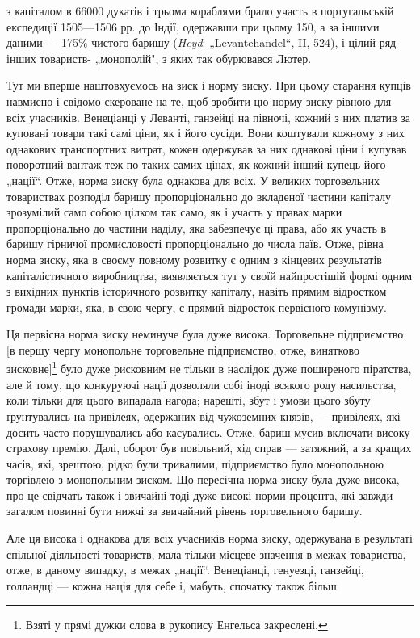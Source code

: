 \parcont{}  %
з капіталом в 66000 дукатів і трьома кораблями брало участь в португальській експедиції 1505—1506 рр. до Індії, одержавши
при цьому 150, а за іншими даними — 175\% чистого баришу (\emph{Heyd}: „Levantehandel“, II, 524), і цілий ряд інших товариств-
„монополій", з яких так обурювався Лютер.

Тут ми вперше наштовхуємось на зиск і норму зиску. При цьому старання купців
навмисно і свідомо скероване на те, щоб зробити цю норму зиску рівною для всіх учасників. Венеціанці у Леванті, ганзейці на
півночі, кожний з них платив за куповані товари такі самі ціни, як і його сусіди. Вони коштували кожному з них однакових
транспортних витрат, кожен одержував за них однакові ціни і купував поворотний вантаж теж по таких самих цінах, як кожний
інший купець його „нації“. Отже, норма зиску була однакова для всіх. У великих торговельних товариствах розподіл баришу
пропорціонально до вкладеної частини капіталу зрозумілий само собою цілком так само, як і участь у правах марки
пропорціонально до частини наділу, яка забезпечує ці права, або як участь в баришу гірничої промисловості пропорціонально
до числа паїв. Отже, рівна норма зиску, яка в своєму повному розвитку є одним з кінцевих результатів капіталістичного
виробництва, виявляється тут у своїй найпростішій формі одним з вихідних пунктів історичного розвитку капіталу, навіть
прямим відростком громади-марки, яка, в свою чергу, є прямий відросток первісного комунізму.

Ця первісна норма зиску
неминуче була дуже висока. Торговельне підприємство [в першу чергу монопольне торговельне підприємство, отже, винятково
зисковне]\footnote*{Взяті у прямі дужки слова в рукопису Енгельса закреслені.} було дуже рисковним не тільки в наслідок дуже поширеного піратства, але й тому, що конкуруючі нації дозволяли
собі іноді всякого роду насильства, коли тільки для цього випадала нагода; нарешті, збут і умови цього збуту ґрунтувались
на привілеях, одержаних від чужоземних князів, — привілеях, які досить часто порушувались або касувались. Отже, бариш
мусив включати високу страхову премію. Далі, оборот був повільний, хід справ — затяжний, а за кращих часів, які, зрештою,
рідко були тривалими, підприємство було монопольною торгівлею з монопольним зиском. Що пересічна норма зиску була дуже
висока, про це свідчать також і звичайні тоді дуже високі норми процента, які завжди загалом повинні бути нижчі за
звичайний рівень торговельного баришу.

Але ця висока і однакова для всіх учасників норма зиску, одержувана в результаті
спільної діяльності товариств, мала тільки місцеве значення в межах товариства, отже, в даному випадку, в межах „нації“.
Венеціанці, генуезці, ганзейці, голландці — кожна нація для себе і, мабуть, спочатку також більш
\parbreak{}  %
